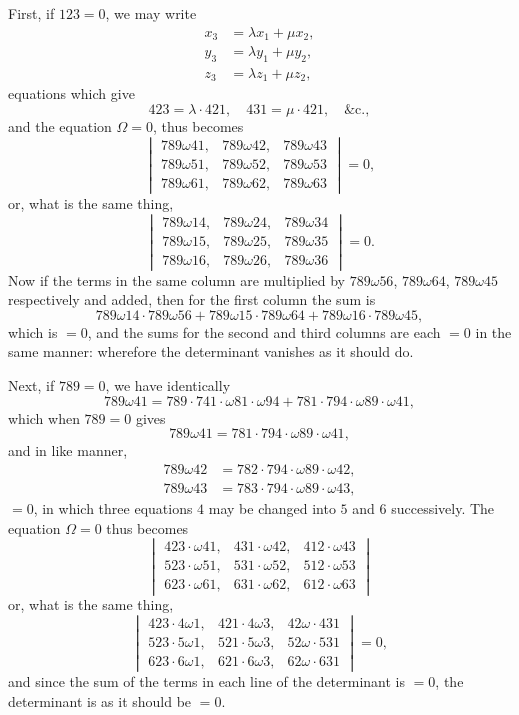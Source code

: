 \documentclass[11pt,a4paper]{article}
\begin{document}
First, if $123 = 0$, we may write
\begin{align*}
x_3 &= \lambda x_1 + \mu x_2,\\
y_3 &= \lambda y_1 + \mu y_2,\\
z_3 &= \lambda z_1 + \mu z_2,
\end{align*}
equations which give
\[
423 = \lambda \cdot 421,\quad 431 = \mu \cdot 421,\quad \&\mathrm{c.},
\]
and the equation $\Omega = 0$, thus becomes
\[
\begin{vmatrix}
789\omega 41, & 789\omega 42, & 789\omega 43\\
789\omega 51, & 789\omega 52, & 789\omega 53\\
789\omega 61, & 789\omega 62, & 789\omega 63
\end{vmatrix}
= 0,
\]
or, what is the same thing,
\[
\begin{vmatrix}
789\omega 14, & 789\omega 24, & 789\omega 34\\
789\omega 15, & 789\omega 25, & 789\omega 35\\
789\omega 16, & 789\omega 26, & 789\omega 36
\end{vmatrix}
= 0.
\]
Now if the terms in the same column are multiplied by $789\omega 56$, $789\omega 64$, $789\omega 45$ respectively and added, then for the first column the sum is
\[
789\omega 14 \cdot 789\omega 56 + 789\omega 15 \cdot 789\omega 64 + 789\omega 16 \cdot 789\omega 45,
\]
which is $= 0$, and the sums for the second and third columns are each $= 0$ in the same manner: wherefore the determinant vanishes as it should do.

\newpage
\setcounter{page}{504}

Next, if $789 = 0$, we have identically
\[
789\omega 41 = 789 \cdot 741 \cdot \omega 81 \cdot \omega 94 + 781 \cdot 794 \cdot \omega 89 \cdot \omega 41,
\]
which when $789 = 0$ gives
\[
789\omega 41 = 781 \cdot 794 \cdot \omega 89 \cdot \omega 41,
\]
and in like manner,
\begin{align*}
789\omega 42 &= 782 \cdot 794 \cdot \omega 89 \cdot \omega 42,\\
789\omega 43 &= 783 \cdot 794 \cdot \omega 89 \cdot \omega 43,
\end{align*}
$= 0$, in which three equations $4$ may be changed into $5$ and $6$ successively. The equation $\Omega = 0$ thus becomes
\[
\begin{vmatrix}
423 \cdot \omega 41, & 431 \cdot \omega 42, & 412 \cdot \omega 43\\
523 \cdot \omega 51, & 531 \cdot \omega 52, & 512 \cdot \omega 53\\
623 \cdot \omega 61, & 631 \cdot \omega 62, & 612 \cdot \omega 63
\end{vmatrix}
\]
or, what is the same thing,
\[
\begin{vmatrix}
423 \cdot 4\omega 1, & 421 \cdot 4\omega 3, & 42\omega \cdot 431\\
523 \cdot 5\omega 1, & 521 \cdot 5\omega 3, & 52\omega \cdot 531\\
623 \cdot 6\omega 1, & 621 \cdot 6\omega 3, & 62\omega \cdot 631
\end{vmatrix}
= 0,
\]
and since the sum of the terms in each line of the determinant is $=0$, the determinant is as it should be $= 0$.
\end{document}
